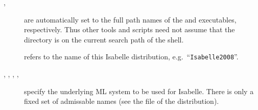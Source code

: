 \begin{isabellebody}
\begin{isamarkuptext}
\begin{description}
  \item[\hypertarget{setting.ISABELLE-PROCESS}{\hyperlink{setting.ISABELLE-PROCESS}{\mbox{}}}\isa{{\isachardoublequote}\isactrlsup {\isacharasterisk}{\isachardoublequote}}, \hyperlink{setting.ISABELLE-TOOL}{\mbox{}}\isa{{\isachardoublequote}\isactrlsup {\isacharasterisk}{\isachardoublequote}}] are automatically set to the full path
  names of the \hyperlink{executable.isabelle-process}{\mbox{}} and \hyperlink{executable.isabelle}{\mbox{}} executables, respectively.  Thus other tools and scripts
  need not assume that the \hyperlink{file.$ISABELLE-HOME/bin}{\mbox{}} directory is
  on the current search path of the shell.
  
  \item[\hypertarget{setting.ISABELLE-IDENTIFIER}{\hyperlink{setting.ISABELLE-IDENTIFIER}{\mbox{}}}\isa{{\isachardoublequote}\isactrlsup {\isacharasterisk}{\isachardoublequote}}] refers
  to the name of this Isabelle distribution, e.g.\ ``\verb|Isabelle2008|''.

  \item[\hypertarget{setting.ML-SYSTEM}{\hyperlink{setting.ML-SYSTEM}{\mbox{}}}, \hypertarget{setting.ML-HOME}{\hyperlink{setting.ML-HOME}{\mbox{}}},
  \hypertarget{setting.ML-OPTIONS}{\hyperlink{setting.ML-OPTIONS}{\mbox{}}}, \hypertarget{setting.ML-PLATFORM}{\hyperlink{setting.ML-PLATFORM}{\mbox{}}}, \hypertarget{setting.ML-IDENTIFIER}{\hyperlink{setting.ML-IDENTIFIER}{\mbox{}}}\isa{{\isachardoublequote}\isactrlsup {\isacharasterisk}{\isachardoublequote}}] specify the underlying ML system
  to be used for Isabelle.  There is only a fixed set of admissable
  \hyperlink{setting.ML-SYSTEM}{\mbox{}} names (see the \hyperlink{file.$ISABELLE-HOME/etc/settings}{\mbox{}} file of the distribution).
  

\end{description}
\end{isamarkuptext}
\end{isabellebody}
